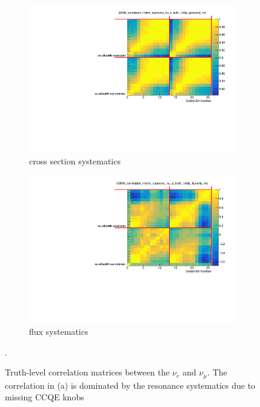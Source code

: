 \documentclass[a4paper]{article}
\begin{document}
\begin{figure}[ht] 
\begin{center}
    \begin{subfigure}[b]{0.45\textwidth}
    \centering
    \includegraphics[width=1.00\textwidth]{Sensitivity/numuconstraint-truth/SBNfit_correlation_matrix_nuenumu_nu_e_truth_1eNp_genieonly_mc_collapsed.pdf}
    \caption{cross section systematics}
    \end{subfigure}
    \begin{subfigure}[b]{0.45\textwidth}
    \centering
    \includegraphics[width=1.00\textwidth]{Sensitivity/numuconstraint-truth/SBNfit_correlation_matrix_nuenumu_nu_e_truth_1eNp_fluxonly_mc_collapsed.pdf}
    \caption{flux systematics}
    \end{subfigure}
\caption{\label{fig:numuconstrainttruth} Truth-level correlation matrices between the $\nu_e$ and $\nu_\mu$. The correlation in (a) is dominated by the resonance systematics due to missing CCQE knobs ~\cite{bib:fluxtechnote}}.
\end{center}
\end{figure}
\end{document}
